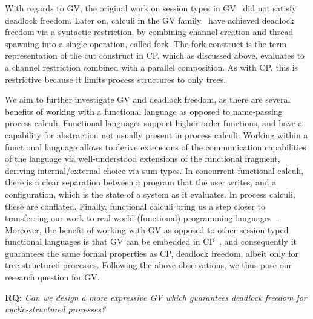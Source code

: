 \documentclass[main.tex]{subfiles}
\begin{document}
With regards to GV, the original work on session types in GV~\cite{gayvasconcelos12} did not satisfy deadlock freedom. Later on, calculi in the GV family~\cite{wadler15,lindleymorris15} have achieved deadlock freedom via a syntactic restriction, \ie by combining channel creation and thread spawning into a single operation, called fork. The fork construct is the term representation of the cut construct in CP, which as discussed above, evaluates to a channel restriction combined with a parallel composition. As with CP, this is restrictive because it limits process structures to only trees.

We aim to further investigate GV and deadlock freedom, as there are several benefits of working with a functional language as opposed to name-passing process calculi. Functional languages support higher-order functions, and have a capability for abstraction not usually present in process calculi. Working within a functional language allows to derive extensions of the communication capabilities of the language via well-understood extensions of the functional fragment, \ie deriving internal/external choice via sum types. In concurrent functional calculi, there is a clear separation between a program that the user writes, and a configuration, which is the state of a system as it evaluates. In process calculi, these are conflated. Finally, functional calculi bring us a step closer to transferring our work to real-world (functional) programming languages~\cite{KD21b}.
Moreover, the benefit of working with GV as opposed to other session-typed functional languages is that GV can be embedded in CP~\cite{wadler14}, and consequently it guarantees the same formal properties as CP, \eg deadlock freedom, albeit only for tree-structured processes.
Following the above observations, we thus pose our research question for GV.

\textbf{RQ:} \emph{Can we design a more expressive GV which guarantees deadlock freedom for cyclic-structured processes?}
\end{document}

